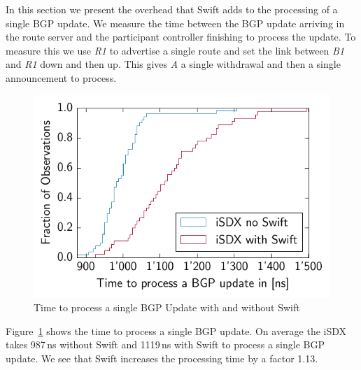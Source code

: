 In this section we present the overhead that Swift adds to the processing of a single BGP update. We measure the time between the BGP update arriving in the route server and the participant controller finishing to process the update. To measure this we use \emph{R1} to advertise a single route and set the link between \emph{B1} and \emph{R1} down and then up. This gives \emph{A} a single withdrawal and then a single announcement to process. 

\begin{figure}[h]
\center
\includegraphics[scale = 1]{Figures/cdf.pdf}
\caption{Time to process a single BGP Update with and without Swift}
\label{fig:swiftoverhead}
\end{figure}

Figure~\ref{fig:swiftoverhead} shows the time to process a single BGP update. On average the iSDX takes 987\,ns without Swift and 1119\,ns with Swift to process a single BGP update. We see that Swift increases the processing time by a factor 1.13.

\newpage